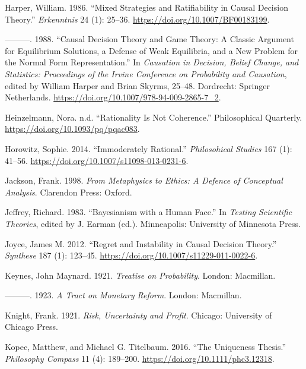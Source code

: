 \documentclass[
  12pt,
  letterpaper,
  DIV=11,
  numbers=noendperiod]{scrreprt}
\newlength{\cslhangindent}
\newenvironment{CSLReferences}[2] %
 {\begin{list}{}{%
  \setlength{\itemindent}{0pt}
  \setlength{\leftmargin}{0pt}
  \setlength{\parsep}{0pt}
  \ifodd #1
   \setlength{\leftmargin}{\cslhangindent}
   \setlength{\itemindent}{-1\cslhangindent}
  \fi
  \setlength{\itemsep}{#2\baselineskip}}}
 {\end{list}}
\begin{document}
\begin{CSLReferences}{1}{0}
Harper, William. 1986. {``Mixed Strategies and Ratifiability in Causal
Decision Theory.''} \emph{Erkenntnis} 24 (1): 25--36.
\url{https://doi.org/10.1007/BF00183199}.

---------. 1988. {``Causal Decision Theory and Game Theory: A Classic
Argument for Equilibrium Solutions, a Defense of Weak Equilibria, and a
New Problem for the Normal Form Representation.''} In \emph{Causation in
Decision, Belief Change, and Statistics: Proceedings of the Irvine
Conference on Probability and Causation}, edited by William Harper and
Brian Skyrms, 25--48. Dordrecht: Springer Netherlands.
\url{https://doi.org/10.1007/978-94-009-2865-7_2}.

Heinzelmann, Nora. n.d. {``Rationality Is Not Coherence.''}
Philosophical Quarterly. \url{https://doi.org/10.1093/pq/pqac083}.

Horowitz, Sophie. 2014. {``Immoderately Rational.''} \emph{Philosohical
Studies} 167 (1): 41--56.
\url{https://doi.org/10.1007/s11098-013-0231-6}.

Jackson, Frank. 1998. \emph{From Metaphysics to Ethics: A Defence of
Conceptual Analysis}. Clarendon Press: Oxford.

Jeffrey, Richard. 1983. {``Bayesianism with a Human Face.''} In
\emph{Testing Scientific Theories}, edited by J. Earman (ed.).
Minneapolis: University of Minnesota Press.

Joyce, James M. 2012. {``Regret and Instability in Causal Decision
Theory.''} \emph{Synthese} 187 (1): 123--45.
\url{https://doi.org/10.1007/s11229-011-0022-6}.

Keynes, John Maynard. 1921. \emph{Treatise on Probability}. London:
Macmillan.

---------. 1923. \emph{A Tract on Monetary Reform}. London: Macmillan.

Knight, Frank. 1921. \emph{Risk, Uncertainty and Profit}. Chicago:
University of Chicago Press.

Kopec, Matthew, and Michael G. Titelbaum. 2016. {``The Uniqueness
Thesis.''} \emph{Philosophy Compass} 11 (4): 189--200.
\url{https://doi.org/10.1111/phc3.12318}.


\end{CSLReferences}
\end{document}
